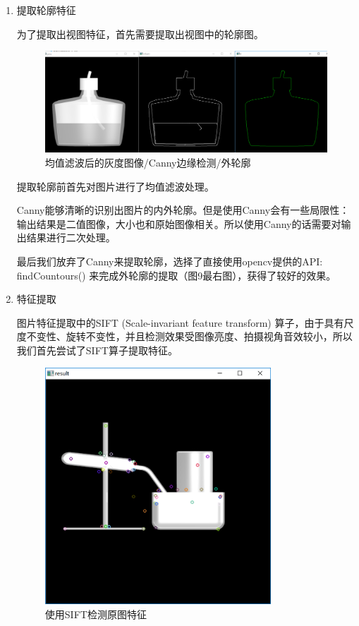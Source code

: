 \documentclass{article}
\begin{document}
\begin{enumerate}
    \begin{enumerate}
        \item 提取轮廓特征
        
        \qquad 为了提取出视图特征，首先需要提取出视图中的轮廓图。
        
    \begin{figure}[hb]
    \centering
    \includegraphics[width=1\textwidth]{images/Canny.png}
    \caption{均值滤波后的灰度图像/Canny边缘检测/外轮廓}\label{fig:digit}
    \end{figure} 
    
    
    \qquad 提取轮廓前首先对图片进行了均值滤波处理。
    
    \qquad Canny能够清晰的识别出图片的内外轮廓。但是使用Canny会有一些局限性：输出结果是二值图像，大小也和原始图像相关。所以使用Canny的话需要对输出结果进行二次处理。
    
    \qquad 最后我们放弃了Canny来提取轮廓，选择了直接使用opencv提供的API: findCountours() 来完成外轮廓的提取（图9最右图），获得了较好的效果。
    
    \item 特征提取
    
    \qquad 图片特征提取中的SIFT (Scale-invariant feature transform) 算子，由于具有尺度不变性、旋转不变性，并且检测效果受图像亮度、拍摄视角音效较小，所以我们首先尝试了SIFT算子提取特征。
    
    \begin{figure}[h]
    \centering
    \includegraphics[width=0.8\textwidth]{images/SIFT-origin.png}
    \caption{使用SIFT检测原图特征}\label{fig:digit}
    \end{figure} 
    

\end{enumerate}
\end{enumerate}
\end{document}
